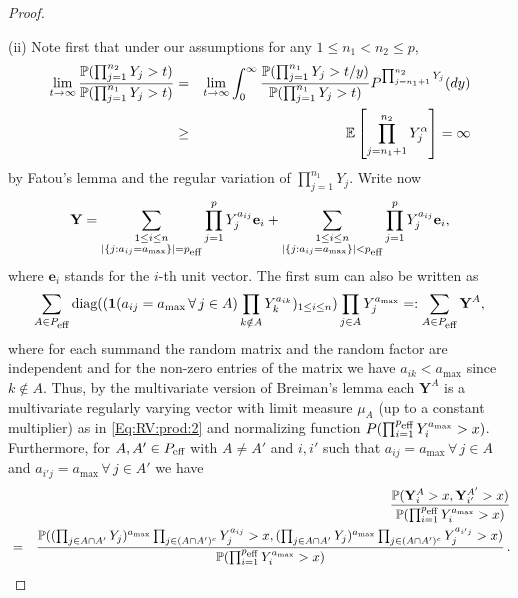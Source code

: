 \begin{proof}
\begin{small}
\end{small}
(ii) Note first that under our assumptions for any $1\leq n_1 < n_2 \leq p$,
\begin{eqnarray}\nonumber \lim_{t \to \infty}\frac{{\mathbb P}(\prod_{j=1}^{n_2} Y_j>t)}{{\mathbb P}(\prod_{j=1}^{n_1} Y_j>t)}
\label{Eq:non:conv:equiv} &=& \lim_{t \to \infty} \int_0^\infty \frac{{\mathbb P}(\prod_{j=1}^{n_1} Y_j>t/y)}{{\mathbb P}(\prod_{j=1}^{n_1} Y_j>t)}P^{\prod_{j=n_1+1}^{n_2}Y_j}(dy)\\
&\geq& {\mathbb E}\left[\prod_{j=n_1+1}^{n_2}Y_j^\alpha\right]=\infty
\end{eqnarray}
by Fatou's lemma and the regular variation of $\prod_{j=1}^{n_1}Y_j$. Write now
\begin{equation}\label{Eq:split:sum}\mathbf{Y}=\sum_{\substack{1 \leq i \leq n \\ |\{j:a_{ij}=a_{\max}\}|=p_{\mbox{\scriptsize eff}}}} \prod_{j=1}^p Y_j^{a_{ij}} \mathbf{e}_i + \sum_{\substack{1 \leq i \leq n \\ |\{j:a_{ij}=a_{\max}\}|<p_{\mbox{\scriptsize eff}}}} \prod_{j=1}^p Y_j^{a_{ij}} \mathbf{e}_i,
\end{equation}
where $\mathbf{e}_i$ stands for the $i$-th unit vector. The first sum can also be written as
\begin{equation}\label{Eq:split:YA}\sum_{A \in P_{\mbox{\scriptsize eff}}}\mbox{diag}((\mathbf{1}(a_{ij}=a_{\max} \, \forall\, j \in A)\prod_{k \notin A}Y_k^{a_{ik}})_{1 \leq i \leq n})\prod_{j \in A}Y_j^{a_{\max}}=:\sum_{A \in P_{\mbox{\scriptsize eff}}}\mathbf{Y}^A, 
\end{equation}
where for each summand the random matrix and the random factor are independent and for the non-zero entries of the matrix we have $a_{ik}<a_{\max}$ since $k \notin A$. Thus, by the multivariate version of Breiman's lemma each $\mathbf{Y}^A$ is a multivariate regularly varying vector with limit measure $\mu_A$ (up to a constant multiplier) as in \eqref{Eq:RV:prod:2} and normalizing function $P(\prod_{i=1}^{p_{\mbox{\scriptsize eff}}}Y_i^{a_{\max}}>x)$. Furthermore, for $A, A' \in P_{\mbox{\scriptsize eff}}$ with $A \neq A'$ and $i,i'$ such that $a_{ij}=a_{\max} \, \forall\, j \in A$ and $a_{i'j}=a_{\max} \, \forall\, j \in A'$ we have
\begin{eqnarray}\label{Eq:asymp:ind:YA} && \frac{\P(\mathbf{Y}^A_i>x,\mathbf{Y}^{A'}_{i'}>x)}{\P(\prod_{i=1}^{p_{\mbox{\scriptsize eff}}}Y_i^{a_{\max}}>x)}\\
\nonumber &=& \frac{\P((\prod_{j \in A \cap A'}Y_j)^{a_{\max}}\prod_{j \in (A \cap A')^c}Y_j^{a_{ij}}>x,(\prod_{j \in A \cap A'}Y_j)^{a_{\max}}\prod_{j \in (A \cap A')^c}Y_j^{a_{i'j}}>x)}{\P(\prod_{i=1}^{p_{\mbox{\scriptsize eff}}}Y_i^{a_{\max}}>x)}\,. 

\end{eqnarray}
\end{proof}
